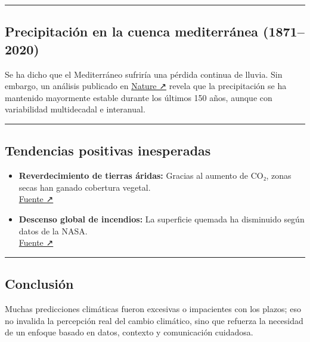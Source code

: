 \documentclass[
  11pt,
  a4paper,
  DIV=11,
  numbers=noendperiod]{scrreprt}
\providecommand{\tightlist}{%
  \setlength{\itemsep}{0pt}\setlength{\parskip}{0pt}}
\begin{document}
\begin{center}\rule{0.5\linewidth}{0.5pt}\end{center}

\subsection{Precipitación en la cuenca mediterránea
(1871--2020)}\label{precipitaciuxf3n-en-la-cuenca-mediterruxe1nea-18712020}

Se ha dicho que el Mediterráneo sufriría una pérdida continua de lluvia.
Sin embargo, un análisis publicado en
\href{https://www.nature.com/articles/s41586-024-08576-6/figures/2}{Nature
↗} revela que la precipitación se ha mantenido mayormente estable
durante los últimos 150 años, aunque con variabilidad multidecadal e
interanual.

\begin{center}\rule{0.5\linewidth}{0.5pt}\end{center}

\subsection{Tendencias positivas
inesperadas}\label{tendencias-positivas-inesperadas}

\begin{itemize}
\tightlist
\item
  \textbf{Reverdecimiento de tierras áridas:} Gracias al aumento de CO₂,
  zonas secas han ganado cobertura vegetal.\\
  \href{https://e360.yale.edu/features/greening-drylands-carbon-dioxide-climate-change}{Fuente
  ↗}\\
\item
  \textbf{Descenso global de incendios:} La superficie quemada ha
  disminuido según datos de la NASA.\\
  \href{https://visibleearth.nasa.gov/images/90493/researchers-detect-a-global-drop-in-fires}{Fuente
  ↗}
\end{itemize}

\begin{center}\rule{0.5\linewidth}{0.5pt}\end{center}

\subsection{Conclusión}\label{conclusiuxf3n}

Muchas predicciones climáticas fueron excesivas o impacientes con los
plazos; eso no invalida la percepción real del cambio climático, sino
que refuerza la necesidad de un enfoque basado en datos, contexto y
comunicación cuidadosa.
\end{document}
